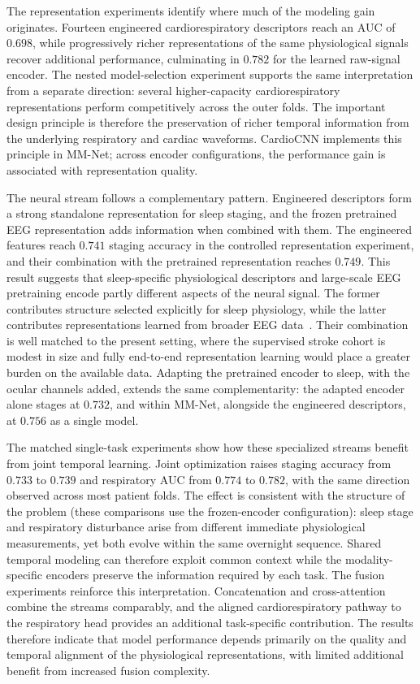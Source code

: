 \documentclass[a4paper,fleqn]{cas-sc}
\newcommand{\mmAccS}{0.756}
\begin{document}
The representation experiments identify where much of the modeling gain
originates. Fourteen engineered cardiorespiratory descriptors reach an AUC of
$0.698$, while progressively richer representations of the same physiological
signals recover additional performance, culminating in $0.782$ for the learned
raw-signal encoder. The nested model-selection experiment supports the same
interpretation from a separate direction: several higher-capacity
cardiorespiratory representations perform competitively across the outer
folds. The important design principle is therefore the preservation of richer
temporal information from the underlying respiratory and cardiac waveforms.
CardioCNN implements this principle in MM-Net; across encoder configurations, the performance gain is associated with representation quality.

The neural stream follows a complementary pattern. Engineered descriptors form a strong standalone representation for sleep staging, and the frozen pretrained EEG representation adds information when combined with them. The
engineered features reach $0.741$ staging accuracy in the controlled
representation experiment, and their combination with the pretrained
representation reaches $0.749$. This result suggests that sleep-specific
physiological descriptors and large-scale EEG pretraining encode partly
different aspects of the neural signal. The former contributes structure
selected explicitly for sleep physiology, while the latter contributes
representations learned from broader EEG data~\cite{labram2024}. Their
combination is well matched to the present setting, where the supervised stroke
cohort is modest in size and fully end-to-end representation learning would
place a greater burden on the available data. Adapting the pretrained encoder to sleep, with
the ocular channels added, extends the same complementarity: the adapted encoder alone stages
at $0.732$, and within MM-Net, alongside the engineered descriptors, at $\mmAccS$ as a single
model.

The matched single-task experiments show how these specialized streams benefit
from joint temporal learning. Joint optimization raises staging accuracy from
$0.733$ to $0.739$ and respiratory AUC from $0.774$ to $0.782$, with the same
direction observed across most patient folds. The effect is consistent with the
structure of the problem (these comparisons use the frozen-encoder configuration): sleep
stage and respiratory disturbance arise from
different immediate physiological measurements, yet both evolve within the
same overnight sequence. Shared temporal modeling can therefore exploit common
context while the modality-specific encoders preserve the information required
by each task. The fusion experiments reinforce this interpretation. Concatenation and
cross-attention combine the streams comparably, and the aligned cardiorespiratory pathway to
the respiratory head provides an additional task-specific contribution. The results therefore indicate that model performance depends primarily on the quality and temporal alignment of the physiological representations, with limited additional benefit from increased fusion complexity.
\end{document}
